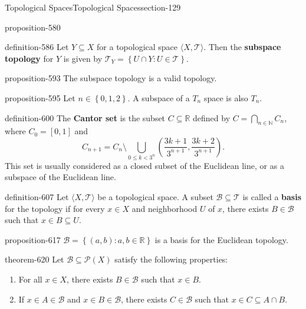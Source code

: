 \documentclass[oneside,10pt,]{article}
\newcommand{\terminology}[1]{\textbf{#1}}
\newcommand{\tuple}[1]{\langle #1 \rangle}
\newcommand{\mb}{\mathbb}
\newcommand{\mc}{\mathcal}
\newcommand{\setBuilder}[2]{\left\{#1:#2\right\}}
\newcommand{\setList}[1]{\left\{#1\right\}}
\newcommand{\lt}{<}
\begin{document}
\begin{sectionptx}{Topological Spaces}{}{Topological Spaces}{}{}{section-129}
\begin{proposition}{}{}{proposition-580}
\end{proposition}
\begin{definition}{}{definition-586}%
\hypertarget{p-587}{}%
Let \(Y\subseteq X\) for a topological space \(\tuple{X,\mc T}\). Then the \terminology{subspace topology} for \(Y\) is given by \(\mc T_Y=\setBuilder{U\cap Y}{U\in\mc T}\).%
\end{definition}
\begin{proposition}{}{}{proposition-593}%
\hypertarget{p-594}{}%
The subspace topology is a valid topology.%
\end{proposition}
\begin{proposition}{}{}{proposition-595}%
\hypertarget{p-596}{}%
Let \(n\in\setList{0,1,2}\). A subspace of a \(T_n\) space is also \(T_n\).%
\end{proposition}
\begin{definition}{}{definition-600}%
\hypertarget{p-601}{}%
The \terminology{Cantor set} is the subset \(C\subseteq\mb R\) defined by \(C=\bigcap_{n\in\mb N} C_n\), where \(C_0=[0,1]\) and%
\begin{equation*}
C_{n+1}=C_n\setminus\bigcup_{0\leq k\lt 3^n} 
\left(\frac{3k+1}{3^{n+1}},\frac{3k+2}{3^{n+1}}\right).
\end{equation*}
This set is usually considered as a closed subset of the Euclidean line, or as a subspace of the Euclidean line.%
\end{definition}
\begin{definition}{}{definition-607}%
\hypertarget{p-608}{}%
Let \(\tuple{X,\mc T}\) be a topological space. A subset \(\mc B\subseteq\mc T\) is called a \terminology{basis} for the topology if for every \(x\in X\) and neighborhood \(U\) of \(x\), there exists \(B\in\mc B\) such that \(x\in B\subseteq U\).%
\end{definition}
\begin{proposition}{}{}{proposition-617}%
\hypertarget{p-618}{}%
\(\mc B=\setBuilder{(a,b)}{a,b\in\mb R}\) is a basis for the Euclidean topology.%
\end{proposition}
\begin{theorem}{}{}{theorem-620}%
\hypertarget{p-621}{}%
Let \(\mc B\subseteq\mc P(X)\) satisfy the following properties:%
\leavevmode%
\begin{enumerate}
\item\hypertarget{li-624}{}For all \(x\in X\), there exists \(B\in\mc B\) such that \(x\in B\).%
\item\hypertarget{li-628}{}If \(x\in A\in\mc B\) and \(x\in B\in\mc B\), there exists \(C\in\mc B\) such that \(x\in C\subseteq A\cap B\).%

\end{enumerate}
\end{theorem}
\end{sectionptx}
\end{document}
